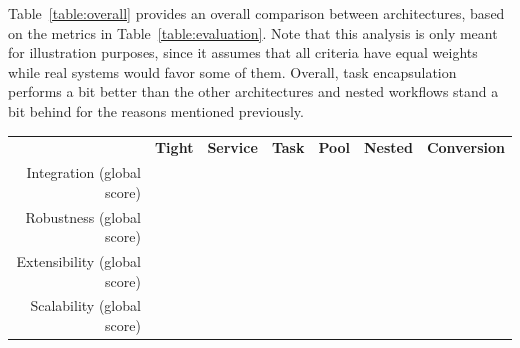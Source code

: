 \documentclass[preprint,3p,twocolumn]{elsarticle}
\begin{document}
Table~\ref{table:overall} provides an overall comparison between
architectures, based on the metrics in Table~\ref{table:evaluation}.
Note that this analysis is only meant for illustration purposes, since
it assumes that all criteria have equal weights while real systems
would favor some of them. Overall, task encapsulation performs a bit
better than the other architectures and nested workflows stand a bit
behind for the reasons mentioned previously.
\begin{table}
\footnotesize
\centering
\begin{tabular}{rcccccc}
                                    & \textbf{Tight}
                                    & \textbf{Service}
                                    & \textbf{Task}
                                    & \textbf{Pool}
                                    & \textbf{Nested}
                                    & \textbf{Conversion} \\
  Integration (global score)    &
                                    \cellcolor[HTML]{99FF99}{0.00}
                                    & \cellcolor[HTML]{99E899}{0.22}
                                    & \cellcolor[HTML]{99FF99}{0.00}
                                    & \cellcolor[HTML]{99D299}{0.44}
                                    & \cellcolor[HTML]{999999}{1.00}
                                      & \cellcolor[HTML]{99DD99}{0.33}\\
Robustness (global score) &
                                \cellcolor[HTML]{99F099}{0.14}
                                    & \cellcolor[HTML]{99D399}{0.43}
                                    & \cellcolor[HTML]{99FF99}{0.00}
                                    & \cellcolor[HTML]{99B699}{0.71}
                                    & \cellcolor[HTML]{999999}{1.00}
                                    & \cellcolor[HTML]{99D399}{0.43}\\
  Extensibility (global score)  & \cellcolor[HTML]{99D299}{0.44}
                                     & \cellcolor[HTML]{99D299}{0.44}
                                     & \cellcolor[HTML]{99FF99}{0.00}
                                     & \cellcolor[HTML]{99E899}{0.22}
                                     & \cellcolor[HTML]{999999}{1.00}
                                     & \cellcolor[HTML]{99E899}{0.22}\\
Scalability (global score)  & \cellcolor[HTML]{999999}{1.00}
                                     & \cellcolor[HTML]{99CC99}{0.50}
                                     & \cellcolor[HTML]{99CC99}{0.50}
                                     & \cellcolor[HTML]{99FF99}{0.00}

\end{tabular}
\end{table}
\end{document}
